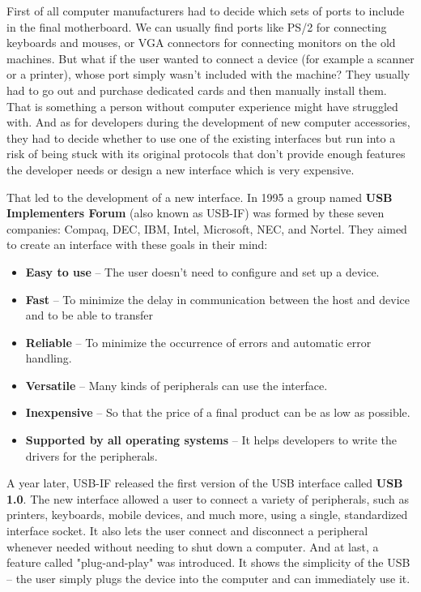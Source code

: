 First of all computer manufacturers had to decide which sets of ports to include in the final motherboard. We can usually find ports like PS/2 for connecting keyboards and mouses, or VGA connectors for connecting monitors on the old machines. But what if the user wanted to connect a device (for example a scanner or a printer), whose port simply wasn't included with the machine? They usually had to go out and purchase dedicated cards and then manually install them. That is something a person without computer experience might have struggled with. And as for developers during the development of new computer accessories, they had to decide whether to use one of the existing interfaces but run into a risk of being stuck with its original protocols that don't provide enough features the developer needs or design a new interface which is very expensive.

That led to the development of a new interface. In 1995 a group named \textbf{USB Implementers Forum} (also known as USB-IF) was formed by these seven companies: Compaq, DEC, IBM, Intel, Microsoft, NEC, and Nortel. They aimed to create an interface with these goals in their mind:
\begin{itemize}
    \item \textbf{Easy to use} \--- The user doesn't need to configure and set up a device.
    \item \textbf{Fast} \--- To minimize the delay in communication between the host and device and to be able to transfer
    \item \textbf{Reliable} \--- To minimize the occurrence of errors and automatic error handling.
    \item \textbf{Versatile} \--- Many kinds of peripherals can use the interface.
    \item \textbf{Inexpensive} \--- So that the price of a final product can be as low as possible.
    \item \textbf{Supported by all operating systems} \--- It helps developers to write the drivers for the peripherals.
\end{itemize}

A year later, USB-IF released the first version of the USB interface called \textbf{USB 1.0}. The new interface allowed a user to connect a variety of peripherals, such as printers, keyboards, mobile devices, and much more, using a single, standardized interface socket. It also lets the user connect and disconnect a peripheral whenever needed without needing to shut down a computer. And at last, a feature called "plug-and-play" was introduced. It shows the simplicity of the USB \--- the user simply plugs the device into the computer and can immediately use it.

